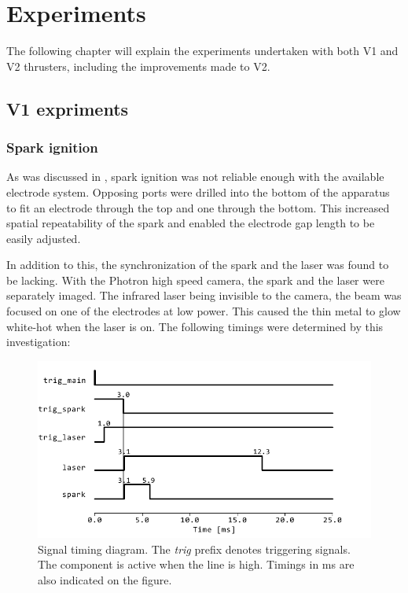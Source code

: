\chapter{Experiments}

    The following chapter will explain the experiments undertaken with both V1 and V2 thrusters, including the improvements made to V2.

    \section{V1 expriments}

        \subsection{Spark ignition}
            
            As was discussed in \textcite{duplayArgonLaserPlasmaThruster2024a}, spark ignition was not reliable enough with the available electrode system. Opposing ports were drilled into the bottom of the apparatus to fit an electrode through the top and one through the bottom. This increased spatial repeatability of the spark and enabled the electrode gap length to be easily adjusted.

            In addition to this, the synchronization of the spark and the laser was found to be lacking. With the Photron high speed camera, the spark and the laser were separately imaged. The infrared laser being invisible to the camera, the beam was focused on one of the electrodes at low power. This caused the thin metal to glow white-hot when the laser is on. The following timings were determined by this investigation:

            \begin{figure}
                \centering
                \includegraphics[width=\textwidth]{assets/4 experiments/timings.pdf}
                \caption{Signal timing diagram. The \textit{trig} prefix denotes triggering signals. The component is active when the line is high. Timings in \unit{ms} are also indicated on the figure.}
            \end{figure}

